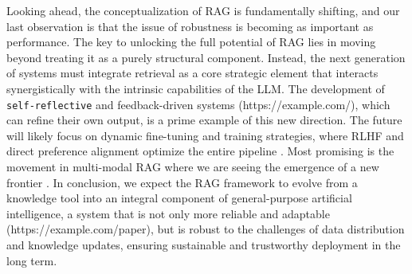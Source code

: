 \documentclass[11pt,a4paper]{article}
\begin{document}
Looking ahead, the conceptualization of RAG is fundamentally shifting, and our last observation is that the issue of robustness is becoming as important as performance. The key to unlocking the full potential of RAG lies in moving beyond treating it as a purely structural component. Instead, the next generation of systems must integrate retrieval as a core strategic element that interacts synergistically with the intrinsic capabilities of the LLM. The development of \texttt{self-reflective} and feedback-driven systems \cite{arxiv:2302.12813v3}(https://example.com/), which can refine their own output, is a prime example of this new direction. The future will likely focus on dynamic fine-tuning and training strategies, where RLHF and direct preference alignment optimize the entire pipeline \cite{arxiv:2311.08401v1}. Most promising is the movement in multi-modal RAG where we are seeing the emergence of a new frontier \cite{arxiv:2210.02928v2}. In conclusion, we expect the RAG framework to evolve from a knowledge tool into an integral component of general-purpose artificial intelligence, a system that is not only more reliable and adaptable \cite{arxiv:2403.03187v1}(https://example.com/paper), but is robust to the challenges of data distribution and knowledge updates, ensuring sustainable and trustworthy deployment in the long term.
\end{document}
